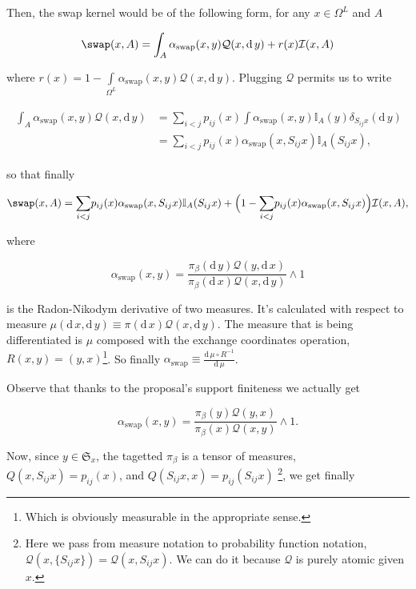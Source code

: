Then, the swap kernel would be of the following form, for any $x \in \Omega^L$ and $A$

\begin{equation*}
	\swap(x,A) = \int_{A} \alpha_\text{swap} (x,y) \mathcal{Q}(x, \mathrm{d}\,y) + r(x) \mathcal{I}(x,A)
\end{equation*}	

where $r(x) = 1 - \underset{\Omega^L}{\int} \alpha_\text{swap} (x,y) \mathcal{Q}(x, \mathrm{d}\,y) $. Plugging $\mathcal{Q}$ permits us to write

\begin{align*}
	\begin{split}
		\int_{A} \alpha_\text{swap} (x,y) \mathcal{Q}(x, \mathrm{d}\,y) &= \underset{ i < j}{\sum} p_{ij}(x) \int \alpha_\text{swap} (x,y) \mathbb{I}_A (y) \delta_{S_{ij}x}(\mathrm{d}\, y) \\ &= \underset{ i < j}{\sum} p_{ij}(x) \alpha_\text{swap} (x, S_{ij}x) \mathbb{I}_A(S_{ij} x),
	\end{split}
\end{align*}	

so that finally

\begin{equation*}
	\swap(x,A) = \underset{ i < j}{\sum} p_{ij}(x) \alpha_\text{swap} (x, S_{ij}x) \mathbb{I}_A(S_{ij} x) + \Big( 1 - \underset{ i < j}{\sum} p_{ij}(x) \alpha_\text{swap} (x, S_{ij}x)\Big) \mathcal{I}(x,A),
\end{equation*}	

where 

	$$\alpha_\text{swap}(x,y) = \frac{\pi_\beta( \mathrm{d}\, y ) \mathcal{Q}(y, \mathrm{d}\,x)}{\pi_\beta( \mathrm{d}\, x ) \mathcal{Q}(x, \mathrm{d}\,y)} \wedge 1$$

is the Radon-Nikodym derivative of two measures. It's calculated with respect to measure $ \mu (\mathrm{d}\,x, \mathrm{d}\,y) \equiv \pi(\mathrm{d}\,x) \mathcal{Q}(x, \mathrm{d}\,y)$. The measure that is being differentiated is $\mu$ composed with the exchange coordinates operation, $R(x,y) = (y,x)$\footnote{Which is obviously measurable in the appropriate sense.}. So finally $\alpha_\text{swap} \equiv \frac{\mathrm{d}\, \mu \circ R^{-1}}{\mathrm{d}\, \mu}$.

Observe that thanks to the proposal's support finiteness we actually get 

	$$\alpha_\text{swap}(x,y) =  \frac{\pi_\beta( y ) \mathcal{Q}(y, x)}{\pi_\beta( x ) \mathcal{Q}(x, y)} \wedge 1.$$


Now, since $y \in \mathfrak{S}_x $, the tagetted $\pi_\beta$ is a tensor of measures, $Q(x, S_{ij} x) = p_{ij}(x)$, and $Q( S_{ij} x, x) = p_{ij}(S_{ij}x)$ \footnote{Here we pass from measure notation to probability function notation, $\mathcal{Q}(x, \{S_{ij}x \}) = \mathcal{Q}(x, S_{ij}x)$. We can do it because $\mathcal{Q}$ is purely atomic given $x$.}, we get finally 


